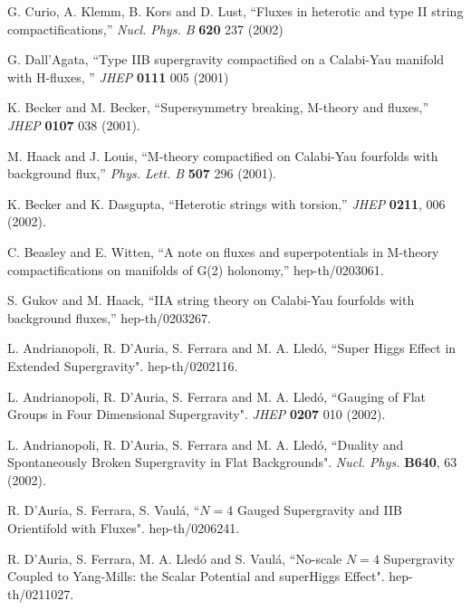 \documentclass[a4paper,12pt]{article}
\begin{document}
\begin{thebibliography}{99}
 G. Curio, A. Klemm, B. Kors and D. Lust,
``Fluxes in heterotic and type II string compactifications,'' {\it Nucl.  Phys.  B }
 {\bf 620} 237 (2002)



 G. Dall'Agata, ``Type IIB supergravity compactified on a Calabi-Yau manifold with H-fluxes,
'' {\it JHEP} {\bf 0111} 005 (2001)


 K. Becker and M. Becker,
``Supersymmetry breaking, M-theory and fluxes,'' {\it JHEP} {\bf
0107} 038 (2001).


 M. Haack and J. Louis,
``M-theory compactified on Calabi-Yau fourfolds with background
flux,'' {\it Phys.  Lett. B} {\bf 507} 296 (2001).


K. Becker and K. Dasgupta, ``Heterotic strings with torsion,''
{\it JHEP} {\bf 0211}, 006 (2002).


















 C. Beasley and E. Witten,
``A note on fluxes and superpotentials in M-theory
compactifications on manifolds of G(2) holonomy,'' hep-th/0203061.


 S. Gukov and M. Haack,
``IIA string theory on Calabi-Yau fourfolds with background
fluxes,'' hep-th/0203267.

 L. Andrianopoli, R. D'Auria, S. Ferrara and M. A. Lled\'o,
``Super Higgs Effect in Extended Supergravity". hep-th/0202116.

 L. Andrianopoli, R. D'Auria, S. Ferrara and M. A. Lled\'o, ``Gauging of Flat
Groups in Four Dimensional Supergravity". {\it JHEP} {\bf 0207}
010 (2002).

 L. Andrianopoli, R. D'Auria, S. Ferrara and M. A. Lled\'o, ``Duality and
Spontaneously Broken Supergravity in Flat Backgrounds". {\it
Nucl. Phys. } {\bf B640}, 63 (2002).






 R. D'Auria, S. Ferrara, S. Vaul\'a, ``$N=4$ Gauged Supergravity and IIB
Orientifold with Fluxes". hep-th/0206241.

 R. D'Auria, S. Ferrara, M. A. Lled\'o and  S.
Vaul\'a, ``No-scale $N=4$ Supergravity Coupled to Yang-Mills: the
Scalar Potential and superHiggs Effect". hep-th/0211027.


\end{thebibliography}
\end{document}
